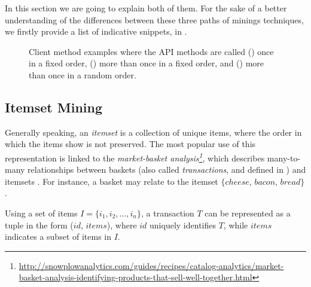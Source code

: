 In this section we are going to explain both of them. For the sake of a better understanding of the differences between these three paths of minings techniques, we firstly provide a list of indicative snippets, in .

\begin{figure}[t]
  \begin{subfigure}[b]{0.3\textwidth}
    
    \caption{}
    \label{listings:example1}
  \end{subfigure}
  \begin{subfigure}[b]{0.3\textwidth}
    
    \caption{}
    \label{listings:example2}
  \end{subfigure}
  \begin{subfigure}[b]{0.3\textwidth}
    
    \caption{}
    \label{listings:example3}
  \end{subfigure}
  \caption[Examples of API method calls inside client code]{Client method examples where the API methods are called () once in a fixed order, () more than once in a fixed order, and () more than once in a random order.}
\label{fig:client-method-examples}
\end{figure}


\subsection{Itemset Mining}
\label{subsec:itemset-mining}

Generally speaking, an \textit{itemset} is a collection of unique items, where the order in which the items show is not preserved. The most popular use of this representation is linked to the \textit{market-basket analysis\footnote{\url{http://snowplowanalytics.com/guides/recipes/catalog-analytics/market-basket-analysis-identifying-products-that-sell-well-together.html}}}, which describes many-to-many relationships between baskets (also called \textit{transactions}, and defined in ) and itemsets \cite{Rajaraman:2012}. For instance, a basket may relate to the itemset $\{cheese$, $bacon$, $bread\}$.

\begin{defn}
\label{def:transaction}
Using a set of items $I=\{i_1,i_2,...,i_n\}$, a transaction $T$ can be represented as a tuple in the form ($id$, $items$), where $id$ uniquely identifies $T$, while $items$ indicates a subset of items in $I$.
\end{defn}

